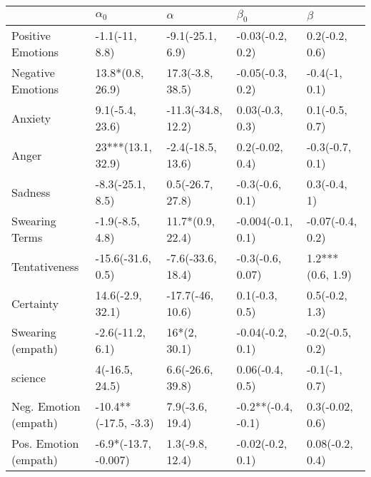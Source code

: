 \begin{tabular}{lllll}
\toprule
{} &            $\alpha_0$ &            $\alpha$ &           $\beta_0$ &           $\beta$ \\
\midrule
Positive Emotions     &        -1.1(-11, 8.8) &    -9.1(-25.1, 6.9) &    -0.03(-0.2, 0.2) &    0.2(-0.2, 0.6) \\
Negative Emotions     &      13.8*(0.8, 26.9) &    17.3(-3.8, 38.5) &    -0.05(-0.3, 0.2) &     -0.4(-1, 0.1) \\
Anxiety               &       9.1(-5.4, 23.6) &  -11.3(-34.8, 12.2) &     0.03(-0.3, 0.3) &    0.1(-0.5, 0.7) \\
Anger                 &     23***(13.1, 32.9) &   -2.4(-18.5, 13.6) &     0.2(-0.02, 0.4) &   -0.3(-0.7, 0.1) \\
Sadness               &      -8.3(-25.1, 8.5) &    0.5(-26.7, 27.8) &     -0.3(-0.6, 0.1) &      0.3(-0.4, 1) \\
Swearing Terms        &       -1.9(-8.5, 4.8) &    11.7*(0.9, 22.4) &   -0.004(-0.1, 0.1) &  -0.07(-0.4, 0.2) \\
Tentativeness         &     -15.6(-31.6, 0.5) &   -7.6(-33.6, 18.4) &    -0.3(-0.6, 0.07) &  1.2***(0.6, 1.9) \\
Certainty             &      14.6(-2.9, 32.1) &    -17.7(-46, 10.6) &      0.1(-0.3, 0.5) &    0.5(-0.2, 1.3) \\
Swearing (empath)     &      -2.6(-11.2, 6.1) &        16*(2, 30.1) &    -0.04(-0.2, 0.1) &   -0.2(-0.5, 0.2) \\
science               &        4(-16.5, 24.5) &    6.6(-26.6, 39.8) &     0.06(-0.4, 0.5) &     -0.1(-1, 0.7) \\
Neg. Emotion (empath) &  -10.4**(-17.5, -3.3) &     7.9(-3.6, 19.4) &  -0.2**(-0.4, -0.1) &   0.3(-0.02, 0.6) \\
Pos. Emotion (empath) &  -6.9*(-13.7, -0.007) &     1.3(-9.8, 12.4) &    -0.02(-0.2, 0.1) &   0.08(-0.2, 0.4) \\
\bottomrule
\end{tabular}
